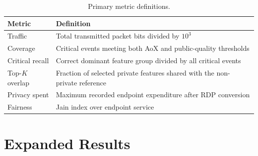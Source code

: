 \documentclass[10pt,conference]{IEEEtran}
\begin{document}
\begin{table}[htbp]
\caption{Primary metric definitions.}
\label{tab:metrics}
\centering\small
\begin{tabular}{p{}p{}}
\toprule
Metric & Definition\\ \midrule
Traffic & Total transmitted packet bits divided by $10^3$\\
Coverage & Critical events meeting both AoX and public-quality thresholds\\
Critical recall & Correct dominant feature group divided by all critical events\\
Top-$K$ overlap & Fraction of selected private features shared with the non-private reference\\
Privacy spent & Maximum recorded endpoint expenditure after RDP conversion\\
Fairness & Jain index over endpoint service\\
\bottomrule
\end{tabular}
\end{table}

\FloatBarrier
\section{Expanded Results}
\end{document}
